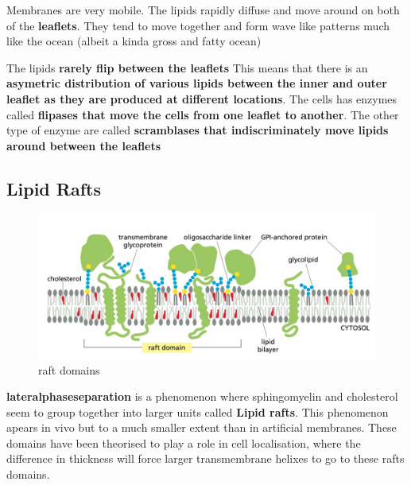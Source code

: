 \documentclass[../main.tex]{subfiles}
\begin{document}
        
    Membranes are very mobile. The lipids rapidly diffuse and move around on both of the \textbf{leaflets}. They tend to move together and form wave like patterns much like the ocean (albeit a kinda gross and fatty ocean)
    \par
    The lipids \textbf{rarely flip between the leaflets} This means that there is an \textbf{asymetric distribution of various lipids between the inner and outer leaflet as they are produced at different locations}. The cells has enzymes called\textbf{ flipases that move the cells from one leaflet to another}. The other type of enzyme are called \textbf{scramblases that indiscriminately move lipids around between the leaflets}
       
    \subsection{Lipid Rafts}
    \begin{figure}[H]
        \centering
        \includegraphics[width=1\linewidth]{rafts.png}
        \caption{raft domains}
        \label{fig:enter-label}
    \end{figure}

    \textbf{\gls{lateralphaseseparation}} is a phenomenon where sphingomyelin and cholesterol seem to group together into larger units called \textbf{Lipid rafts}. This phenomenon apears in vivo but to a much smaller extent than in artificial membranes. These domains have been theorised to play a role in cell localisation, where the difference in thickness will force larger transmembrane helixes to go to these rafts domains.
\end{document}
